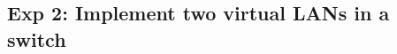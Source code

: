 \documentclass[compilation.tex]{subfiles}
\begin{document}

\subsection{Exp 2: Implement two virtual LANs in a switch}
\label{exp:2}

\end{document}
